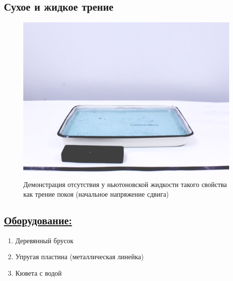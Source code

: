 \documentclass[14pt,a4paper,oneside]{extarticle}	%
\begin{document}

	
\begin{center}
		\subsection*{Сухое и жидкое трение}
\end{center}
	
	\begin{figure}[H] 	%
		\centering 	
		\includegraphics[width=0.9\linewidth]{friction-1.png}
		\caption{Демонстрация отсутствия у ньютоновской жидкости такого свойства как трение покоя (начальное напряжение сдвига)}
		\label{friction-1}
	\end{figure}
	
	\subsection*{\underline{Оборудование:}}
	
	\begin{enumerate} 
		\item Деревянный брусок 
		\item Упругая пластина (металлическая линейка)
		\item Кювета с водой
		
	\end{enumerate}
\end{document}
